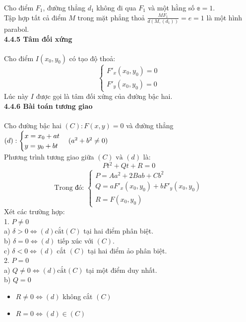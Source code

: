 \documentclass[12pt,a4]{article}
\begin{document}
\begin{titlepage}
\begin{center}
    \end{center}
    Cho điểm $F_1$, đường thẳng $d_1$ không đi qua $F_1$ và một hằng số $\mathbb{e} = 1.$\\
    Tập hợp tất cả điểm $M$ trong mặt phẳng thoả $\frac{MF_1}{d(M,(d_1))} = e = 1$ là một hình parabol.\\
    \textbf{4.4.5 Tâm đối xứng}\\
    \vspace{0.2cm}\\
    Cho điểm $I(x_0,y_0)$ có tạo độ thoả:
    \[
    \begin{cases} F'_x(x_0,y_0) = 0\\ F'_y(x_0,y_0) = 0\end{cases}
    \]
    Lúc này $I$ được gọi là tâm đối xứng của đường bậc hai.\\
    \textbf{4.4.6 Bài toán tương giao}\\
    \vspace{0.2cm}\\
    Cho đường bậc hai $(C): F(x,y) = 0$ và đường thẳng $(d): \begin{cases} x = x_0 + at \\ y = y_0 + bt\end{cases} \\(a^2 + b^2 \neq 0)$\\
    Phương trình tương giao giữa $(C) \text{ và } (d)$ là:
    \[
    Pt^2 + Qt + R = 0
    \]
    \[
    \text{Trong đó: } \begin{cases} P = Aa^2 + 2Bab + Cb^2\\ Q = aF'_x(x_0,y_0) + bF'_y(x_0,y_0)\\R = F(x_0,y_0)\end{cases}
    \]
    Xét các trường hợp:\\
    1. $P \neq 0$\\
    a) $\delta > 0 \Leftrightarrow (d) \text{cắt} (C) $ tại hai điểm phân biệt.\\
    b) $\delta = 0 \Leftrightarrow (d)$ tiếp xúc với $(C)$.\\
    c) $\delta < 0 \Leftrightarrow (d)$ cắt $(C)$ tại hai điểm ảo phân biệt.\\
    2. $P = 0$\\
    a) $Q \neq 0 \Leftrightarrow (d) \text{cắt} (C)$ tại một điểm duy nhất.\\
    b) $Q = 0$
    \begin{itemize}
        \item $R \neq 0 \Leftrightarrow (d)$ không cắt $(C)$
        \item $R = 0 \Leftrightarrow (d) \in (C)$

\end{itemize}
\end{titlepage}
\end{document}
